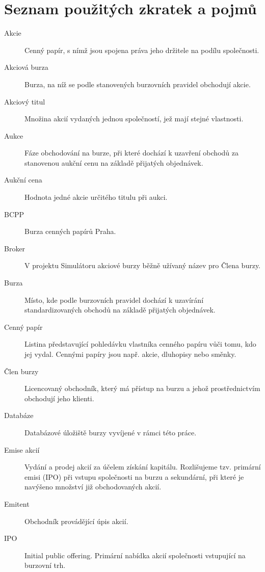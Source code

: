 \documentclass[thesis=M,czech]{FITthesis}[2012/06/26]
\begin{document}




\appendix



\chapter{Seznam použitých zkratek a pojmů}
\begin{description}
	\item[Akcie] Cenný papír, s nímž jsou spojena práva jeho držitele na podílu společnosti.
	\item[Akciová burza] Burza, na níž se podle stanovených burzovních pravidel obchodují akcie.
	\item[Akciový titul] Množina akcií vydaných jednou společností, jež mají stejné vlastnosti. 
	\item[Aukce] Fáze obchodování na burze, při které dochází k uzavření obchodů za stanovenou aukční cenu na základě přijatých objednávek.
	\item[Aukční cena] Hodnota jedné akcie určitého titulu při aukci.
	\item[BCPP] Burza cenných papírů Praha.
	\item[Broker] V projektu Simulátoru akciové burzy běžně užívaný název pro Člena burzy.
	\item[Burza] Místo, kde podle burzovních pravidel dochází k uzavírání standardizovaných obchodů na základě přijatých objednávek.
	\item[Cenný papír] Listina představující pohledávku vlastníka cenného papíru vůči tomu, kdo jej vydal. Cennými papíry jsou např. akcie, dluhopisy nebo směnky.
	\item[Člen burzy] Licencovaný obchodník, který má přístup na burzu a jehož prostřednictvím obchodují jeho klienti.
	\item[Databáze] Databázové úložiště burzy vyvíjené v rámci této práce.
	\item[Emise akcií] Vydání a prodej akcií za účelem získání kapitálu. Rozlišujeme tzv. primární emisi (IPO) při vstupu společnosti na burzu a 
			sekundární, při které je navýšeno množství již obchodovaných akcií.
	\item[Emitent] Obchodník provádějící úpis akcií.
	\item[IPO] Initial public offering. Primární nabídka akcií společnosti vstupující na burzovní trh.

\end{description}
\end{document}
